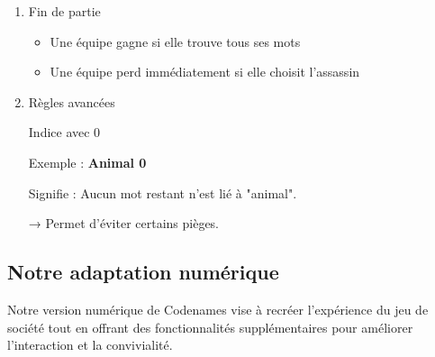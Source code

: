 \documentclass[12pt,a4paper]{article}
\begin{document}
\begin{enumerate}
\begin{enumerate}
                    \end{enumerate}
                
                \vspace{0.5cm}
                \item Fin de partie

                    \begin{itemize}
                        \item Une équipe gagne si elle trouve tous ses mots
                        \item Une équipe perd immédiatement si elle choisit l’assassin
                    \end{itemize}
                
                \vspace{0.5cm}
                \item Règles avancées

                    Indice avec 0

                    \begin{tcolorbox}
                    Exemple : \textbf{Animal 0}
                    \end{tcolorbox}

                    Signifie :
                    Aucun mot restant n’est lié à "animal".

                    → Permet d’éviter certains pièges.

            \end{enumerate}
        
        \subsection{Notre adaptation numérique}
            Notre version numérique de Codenames vise à recréer l'expérience du jeu de société tout en offrant des fonctionnalités supplémentaires pour améliorer l'interaction et la convivialité.
\end{document}
